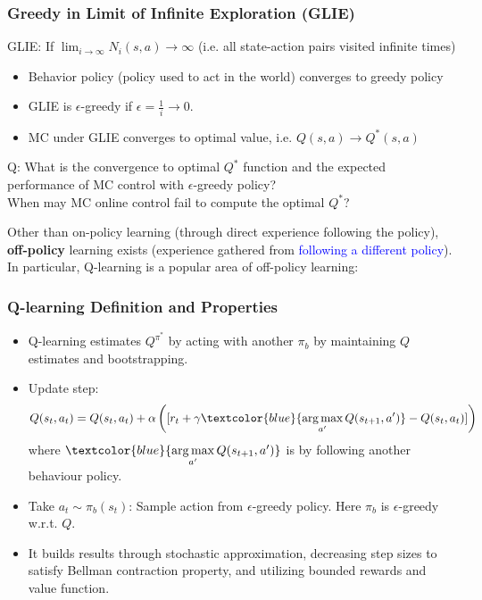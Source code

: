 \documentclass{article}
\begin{document}
\subsubsection{Greedy in Limit of Infinite Exploration (GLIE)}
\begin{defbox}
    GLIE: If $\lim_{i \to \infty} N_i(s, a) \to \infty$ (i.e. all state-action pairs visited infinite times)
    \begin{itemize}
    \item Behavior policy (policy used to act in the world) converges to greedy policy
    \item GLIE is $\epsilon$-greedy if $\epsilon = \frac{1}{i} \to 0$.
    \item MC under GLIE converges to optimal value, i.e. $Q(s, a) \to Q^{*}(s, a)$
    \end{itemize}
\end{defbox}

\begin{hintbox}
    Q: What is the convergence to optimal $Q^{*}$ function and the expected performance of MC control with $\epsilon$-greedy policy?
    \\When may MC online control fail to compute the optimal $Q^{*}$?
\end{hintbox}

Other than on-policy learning (through direct experience following the policy), \textbf{off-policy} learning exists (experience gathered from \textcolor{blue}{following a different policy}).
\\In particular, Q-learning is a popular area of off-policy learning:
\begin{defbox}
    \subsubsection*{Q-learning Definition and Properties}
    \begin{itemize}
        \item Q-learning estimates $Q^{\pi^{*}}$ by acting with another $\pi_b$ by maintaining $Q$ estimates and bootstrapping.
        \item Update step: 
            \begin{equation*}
                Q(s_t, a_t) = Q(s_t, a_t) + \alpha \left( [r_t + \gamma \textcolor{blue}{\mathop{\arg\max}\limits_{a'} Q(s_{t+1}, a')} - Q(s_t, a_t)] \right)
            \end{equation*}
            where $\textcolor{blue}{\mathop{\arg\max}\limits_{a'} Q(s_{t+1}, a')}$ is by following another behaviour policy.
        \item Take $a_t \sim \pi_b(s_t)$: Sample action from $\epsilon$-greedy policy. Here $\pi_b$ is $\epsilon$-greedy w.r.t. $Q$.
        \item It builds results through stochastic approximation, decreasing step sizes to satisfy Bellman contraction property, and utilizing bounded rewards and value function.
    \end{itemize}
\end{defbox}
\end{document}
